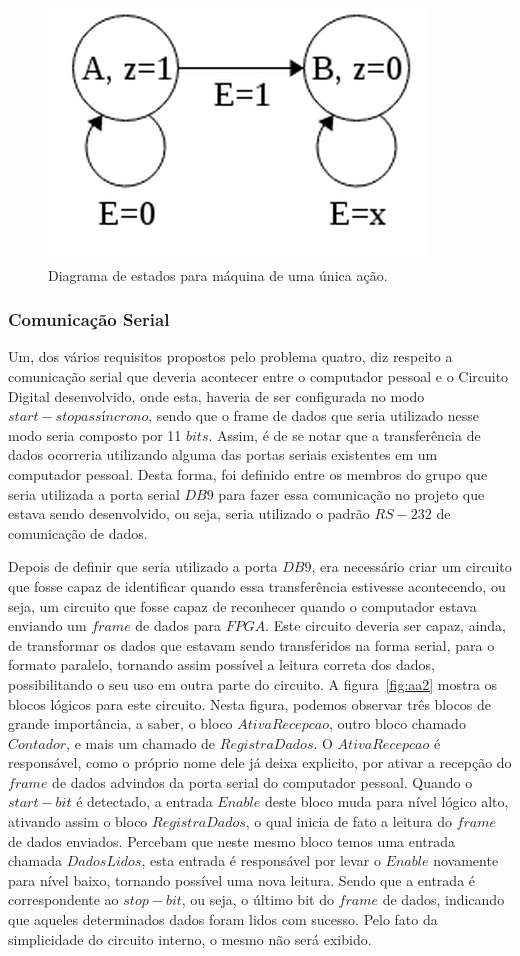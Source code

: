 \documentclass[12pt]{article}
\begin{document}
\begin{figure}[h]
\centering
\includegraphics[width=.3\textwidth]{img/fsm.png}
\caption{Diagrama de estados para máquina de uma única ação.}
\label{fig:fsm}
\end{figure}


\subsubsection{Comunicação Serial}

Um, dos vários requisitos propostos pelo problema quatro, diz respeito a comunicação serial que deveria acontecer entre o computador pessoal e o Circuito Digital desenvolvido, onde esta, haveria de ser configurada no modo $start-stop assíncrono$, sendo que o frame de dados que seria utilizado nesse modo seria composto por 11 $bits$. Assim, é de se notar que a transferência de dados ocorreria utilizando alguma das portas seriais existentes em um computador pessoal. Desta forma, foi definido entre os membros do grupo que seria utilizada a porta serial $DB9$ para fazer essa comunicação no projeto que estava sendo desenvolvido, ou seja, seria utilizado o padrão $RS-232$ de comunicação de dados.

Depois de definir que seria utilizado a porta $DB9$, era necessário criar um circuito que fosse capaz de identificar quando essa transferência estivesse acontecendo, ou seja, um circuito que fosse capaz de reconhecer quando o computador estava enviando um $frame$ de dados para $FPGA$. Este circuito deveria ser capaz, ainda, de transformar os dados que estavam sendo transferidos na forma serial, para o formato paralelo, tornando assim possível a leitura correta dos dados, possibilitando o seu uso em outra parte do circuito. A figura~\ref{fig:aa2} mostra os blocos lógicos para este circuito. Nesta figura, podemos observar três blocos de grande importância, a saber, o bloco $AtivaRecepcao$, outro bloco chamado $Contador$, e mais um chamado  de $RegistraDados$. O $AtivaRecepcao$ é responsável, como o próprio nome dele já deixa explicito, por ativar a recepção do $frame$ de dados advindos da porta serial do computador pessoal. Quando o $start-bit$ é detectado, a entrada $Enable$ deste bloco muda para nível lógico alto, ativando assim o bloco $RegistraDados$, o qual inicia de fato a leitura do $frame$ de dados enviados. Percebam que neste mesmo bloco temos uma entrada chamada $DadosLidos$, esta entrada é responsável por levar o $Enable$ novamente para nível baixo, tornando possível uma nova leitura. Sendo que a entrada é correspondente ao $stop-bit$, ou seja, o último bit do $frame$ de dados, indicando que aqueles determinados dados foram lidos com sucesso. Pelo fato da simplicidade do circuito interno, o mesmo não será exibido. 
\end{document}
